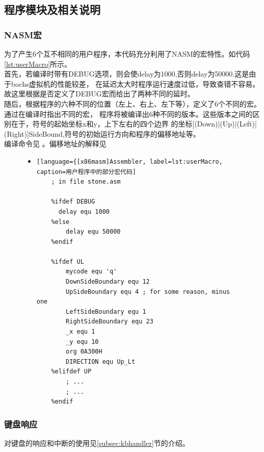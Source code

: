 \documentclass[a4paper]{article}
\newcommand{\codev}[1]{\textsf{#1}}
\begin{document}
    
    \subsection{程序模块及相关说明}\label{subsec:modelIntroduction}
    \subsubsection{NASM宏}
    为了产生6个互不相同的用户程序，本代码充分利用了NASM的宏特性。如代码\ref{lst:userMacro}所示。\\
    
    首先，若编译时带有\codev{DEBUG}选项，则会使delay为1000,否则delay为50000.这是由于bochs虚拟机的性能较差，
    在延迟太大时程序运行速度过低，导致查错不容易。故这里根据是否定义了\codev{DEBUG}宏而给出了两种不同的延时。\\
    
    随后，根据程序的六种不同的位置（左上、右上、左下等），定义了6个不同的宏。通过在编译时指出不同的宏，
    程序将被编译出6种不同的版本。这些版本之间的区别在于，符号的起始坐标\codev{x}和\codev{y}，上下左右的四个边界
    的坐标\codev{[(Down)|(Up)|(Left)|(Right)]SideBound},符号的初始运行方向和程序的偏移地址等。\\
    

    编译命令见%
    。偏移地址的解释见%
    
    \begin{figure}
    \begin{itemize}
    \item[] \begin{lstlisting}[language={[x86masm]Assembler, label=lst:userMacro, caption=用户程序中的部分宏代码]
    ; in file stone.asm 

    %ifdef DEBUG
      delay equ 1000
    %else
        delay equ 50000
    %endif

    %ifdef UL
        mycode equ 'q'
        DownSideBoundary equ 12
        UpSideBoundary equ 4 ; for some reason, minus one
        LeftSideBoundary equ 1
        RightSideBoundary equ 23
        _x equ 1
        _y equ 10
        org 0A300H
        DIRECTION equ Up_Lt
    %elifdef UP
        ; ...
        ; ...
    %endif
    \end{lstlisting}
    \end{itemize}
    \end{figure}
    

    \subsubsection{键盘响应}
    对键盘的响应和中断的使用见\ref{subsec:kbhandler}节的介绍。\\
\end{document}
